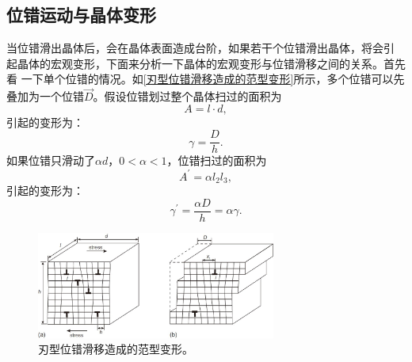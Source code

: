             \subsection{位错运动与晶体变形}
            当位错滑出晶体后，会在晶体表面造成台阶，如果若干个位错滑出晶体，将会引
            起晶体的宏观变形，下面来分析一下晶体的宏观变形与位错滑移之间的关系。首先看
            一下单个位错的情况。如\autoref{刃型位错滑移造成的范型变形}所示，多个位错可以先
            叠加为一个位错$\vec{D}$。假设位错划过整个晶体扫过的面积为
            \begin{equation}
                A=l\cdot d,
            \end{equation}
            引起的变形为：
            \begin{equation}
                \gamma=\frac{D}{h}.
            \end{equation}
            如果位错只滑动了$\alpha d$，$0<\alpha<1$，位错扫过的面积为
            \begin{equation}
                A^\prime=\alpha l_2l_3,
            \end{equation}
            引起的变形为：
            \begin{equation}
                \gamma^\prime=\frac{\alpha D}{h}=\alpha\gamma.                
            \end{equation}
            \begin{figure}[ht]
                \centering
                \includegraphics[width=0.7\textwidth]{fig/deformation_by_edge_dislocation.jpg}
                \caption{刃型位错滑移造成的范型变形。}
                \label{刃型位错滑移造成的范型变形}
            \end{figure}

